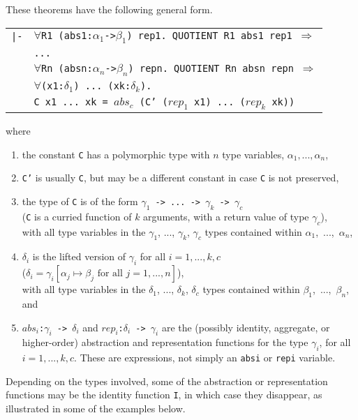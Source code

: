 \documentclass[envcountsame,runningheads]{llncs}
\begin{document}
These theorems have the following general form.
\begin{center}
\begin{tabular}{rl}
{\tt |-}
& {\tt $\forall$R1 (abs1:$\alpha_1$->$\beta_1$) rep1. QUOTIENT R1 abs1 rep1 $\Rightarrow$} \\
& {\tt ...} \\
& {\tt $\forall$Rn (absn:$\alpha_n$->$\beta_n$) repn. QUOTIENT Rn absn repn $\Rightarrow$} \\
& {\tt $\forall$(x1:$\delta_1$) ... (xk:$\delta_k$).}  \\
& \hspace{17mm}
{\tt C x1 ... xk = $abs_c$ (C' ($rep_1$ x1) ... ($rep_k$ xk)) }  \\
\end{tabular}
\end{center}
where
\begin{enumerate}
\item
the constant {\tt C} has a polymorphic type with $n$ type variables,
$\alpha_1, ..., \alpha_n$,
\item
{\tt C'} is usually {\tt C}, but may be a different constant
in case {\tt C} is not preserved,
\item
the type of {\tt C} is of the form
{\tt $\gamma_1$ -> ... -> $\gamma_k$ -> $\gamma_c$} \\
({\tt C} is a curried function of $k$ arguments, with a return value of
type $\gamma_c$), \\
with
all type variables in the $\gamma_1$, ..., $\gamma_k$, $\gamma_c$ types
contained within $\alpha_1$,~...,~$\alpha_n$,
\item
$\delta_i$ is the lifted version of $\gamma_i$ for all $i=1,...,k,c$ \\
($\delta_i = \gamma_i[\alpha_j \mapsto \beta_j \mbox{\ for all\ } j=1,...,n]$),
\\
with
all type variables in the $\delta_1$, ..., $\delta_k$, $\delta_c$ types
contained within $\beta_1$,~...,~$\beta_n$,
and
\item
{\tt $abs_i$:$\gamma_i$ -> $\delta_i$} and
{\tt $rep_i$:$\delta_i$ -> $\gamma_i$}
are the (possibly identity, aggregate, or higher-order)
abstraction and representation functions
for the type $\gamma_i$, for all $i=1,...,k,c$.
These are expressions, not simply an
{\tt absi} or {\tt repi} variable.
\end{enumerate}

Depending on the types involved, some 
of the abstraction or representation functions
may be the identity function {\tt I}, in which case they disappear,
as illustrated in some of the examples below.
\end{document}

